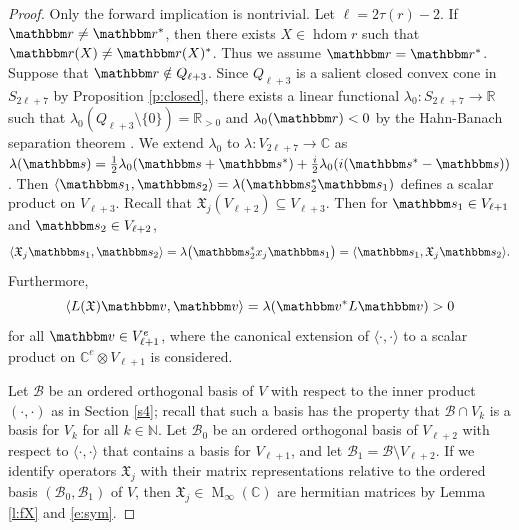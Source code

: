 \documentclass[12pt,a4paper]{amsart}
\DeclareMathOperator{\hdom}{hdom}
\DeclareMathOperator{\opm}{M}
\newcommand{\N}{\mathbb{N}}
\newcommand{\R}{\mathbb{R}}
\newcommand{\C}{\mathbb{C}}
\newcommand{\cB}{\mathcal{B}}
\newcommand{\rr}{\mathbbm r}
\newcommand{\rs}{\mathbbm s}
\newcommand{\rv}{\mathbbm v}
\newcommand{\fX}{\mathfrak{X}}
\newcommand{\cfm}{\opm_\infty(\C)}
\newcommand{\hV}{S}
\theoremstyle{definition}
\theoremstyle{remark}
\numberwithin{equation}{section}
\begin{document}
\begin{proof}
Only the forward implication is nontrivial. Let $\ell=2\tau(r)-2$. If $\rr\neq\rr^*$, then there exists $X\in\hdom r$ such that $\rr(X)\neq\rr(X)^*$. Thus we assume $\rr=\rr^*$. Suppose that $\rr\notin Q_{\ell+3}$. Since $Q_{\ell+3}$ is a salient closed convex cone in $\hV_{2\ell+7}$ by Proposition \ref{p:closed}, there exists a linear functional $\lambda_0:\hV_{2\ell+7}\to\R$ such that $\lambda_0(Q_{\ell+3}\setminus\{0\})=\R_{>0}$ and $\lambda_0(\rr)<0$ by the Hahn-Banach separation theorem \cite[Theorem III.1.3]{Bar}. 
We extend $\lambda_0$ to $\lambda:V_{2\ell+7}\to\C$ as $\lambda(\rs)=\frac12\lambda_0(\rs+\rs^*)+\frac{i}{2}\lambda_0(i(\rs^*-\rs))$.
Then $\langle \rs_1,\rs_2\rangle=\lambda(\rs_2^*\rs_1)$ defines a scalar product on $V_{\ell+3}$. Recall that $\fX_j(V_{\ell+2})\subseteq V_{\ell+3}$. Then for $\rs_1\in V_{\ell+1}$ and $\rs_2\in V_{\ell+2}$,
\begin{equation}\label{e:sym}
\langle \fX_j\rs_1,\rs_2\rangle
 = \lambda\big(\rs_2^*x_j\rs_1\big)
 = \langle \rs_1,\fX_j\rs_2\rangle.
\end{equation}
Furthermore,
\begin{equation}\label{e:L}
\langle L(\fX)\rv,\rv\rangle = \lambda(\rv^*L\rv)>0
\end{equation}
for all $\rv\in V_{\ell+1}^e$, where the canonical extension of $\langle \cdot,\cdot\rangle$ to a scalar product on $\C^e\otimes V_{\ell+1}$ is considered.

Let $\cB$ be an ordered orthogonal basis of $V$ with respect to the inner product $(\cdot,\cdot)$ as in Section \ref{s4}; recall that such a basis has the property that $\cB\cap V_k$ is a basis for $V_k$ for all $k\in\N$. 
Let $\cB_0$ be an ordered orthogonal basis of $V_{\ell+2}$ with respect to $\langle\cdot,\cdot\rangle$ that contains a basis for $V_{\ell+1}$, and let $\cB_1=\cB\setminus V_{\ell+2}$. 
If we identify operators $\fX_j$ with their matrix representations relative to the ordered basis $(\cB_0,\cB_1)$ of $V$, then $\fX_j\in\cfm$ are hermitian matrices by Lemma \ref{l:fX} and \eqref{e:sym}.


\end{proof}
\end{document}
